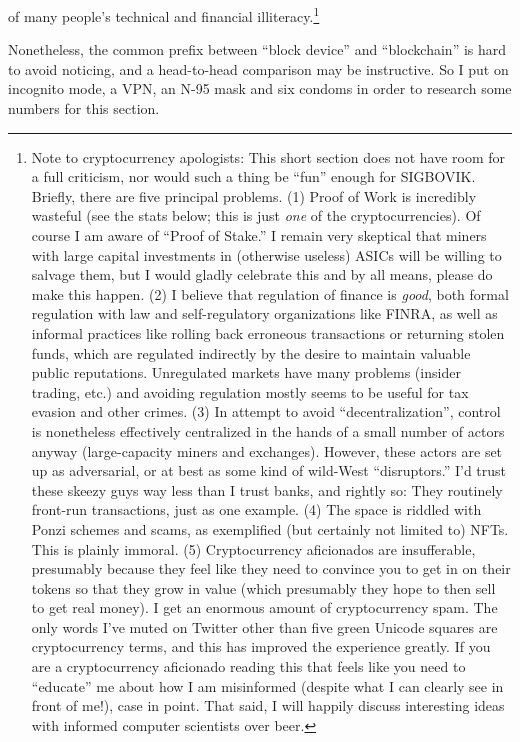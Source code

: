 \documentclass[twocolumn]{article}
\begin{document}
of many people's technical and financial illiteracy.\!\footnote{ Note
  to cryptocurrency apologists: This short section does not have room
  for a full criticism, nor would such a thing be ``fun'' enough for
  SIGBOVIK. Briefly, there are five principal problems. (1) Proof of
  Work is incredibly wasteful (see the stats below; this is just {\em
    one} of the cryptocurrencies). Of course I am aware of ``Proof of
  Stake.'' I remain very skeptical that miners with large capital
  investments in (otherwise useless) ASICs will be willing to salvage
  them, but I would gladly celebrate this and by all means, please do
  make this happen. (2) I believe that regulation of finance is {\em
    good}, both formal regulation with law and self-regulatory
  organizations like FINRA, as well as informal practices like rolling
  back erroneous transactions or returning stolen funds, which are
  regulated indirectly by the desire to maintain valuable public
  reputations. Unregulated markets have many problems (insider
  trading, etc.) and avoiding regulation mostly seems to be useful for
  tax evasion and other crimes. (3) In attempt to avoid
  ``decentralization'', control is nonetheless effectively centralized
  in the hands of a small number of actors anyway (large-capacity
  miners and exchanges). However, these actors are set up as
  adversarial, or at best as some kind of wild-West ``disruptors.''
  I'd trust these skeezy guys way less than I trust banks, and rightly
  so: They routinely front-run transactions, just as one example. (4)
  The space is riddled with Ponzi schemes and scams, as exemplified
  (but certainly not limited to) NFTs. This is plainly immoral. (5)
  Cryptocurrency aficionados are insufferable, presumably because they
  feel like they need to convince you to get in on their tokens so
  that they grow in value (which presumably they hope to then sell to
  get real money). I get an enormous amount of cryptocurrency spam.
  The only words I've muted on Twitter other than five green Unicode
  squares are cryptocurrency terms, and this has improved the
  experience greatly. If you are a cryptocurrency aficionado reading
  this that feels like you need to ``educate'' me about how I am
  misinformed (despite what I can clearly see in front of me!), case
  in point. That said, I will happily discuss interesting ideas with
  informed computer scientists over beer. }

Nonetheless, the common prefix between ``block device'' and
``blockchain'' is hard to avoid noticing, and a head-to-head
comparison may be instructive. So I put on incognito mode, a VPN, an
N-95 mask and six condoms in order to research some numbers for this
section.
\end{document}

